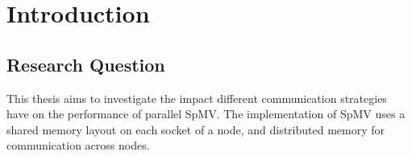 \chapter{Introduction}


\section{Research Question}

This thesis aims to investigate the impact different communication strategies have on the performance of parallel SpMV. The implementation of SpMV uses a shared memory layout on each socket of a node, and distributed memory for communication across nodes.
